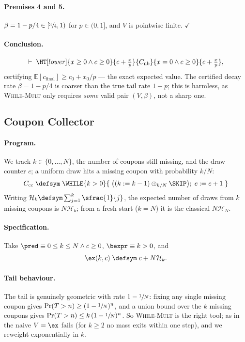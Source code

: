 \paragraph{Premises 4 and 5.}
$\beta = 1 - p/4 \in [\sfrac34, 1)$ for $p \in (0,1]$, and $V$ is pointwise
finite. $\checkmark$

\paragraph{Conclusion.}
\[
  \vdash\; \HT[lower]{x \geq 0 \land c \geq 0}{c + \tfrac{x}{p}}
     {C_{\text{nb}}}{x = 0 \land c \geq 0}{c + \tfrac{x}{p}},
\]
certifying $\mathbb{E}[c_{\text{final}}] \geq c_0 + x_0/p$ --- the exact
expected value. The certified decay rate $\beta = 1-p/4$ is coarser than the
true tail rate $1-p$; this is harmless, as \textsc{While-Mult} only requires
\emph{some} valid pair $(V,\beta)$, not a sharp one.

\subsection{Coupon Collector}\label{app:bench-cc}

\paragraph{Program.}
We track $k \in \{0,\dots,N\}$, the number of coupons still missing, and the
draw counter $c$; a uniform draw hits a missing coupon with probability
$k/N$:
\[
  C_{\text{cc}} \;\defsym\;
  \WHILE{k > 0}{\;
    \bigl((k \mathrel{:=} k-1) \oplus_{k/N} \SKIP\bigr);\;
    c \mathrel{:=} c+1
  \;}
\]
Writing $\mathcal{H}_k \defsym \sum_{j=1}^{k} \sfrac{1}{j}$, the expected
number of draws from $k$ missing coupons is $N \mathcal{H}_k$; from a fresh
start ($k = N$) it is the classical $N \mathcal{H}_N$.

\paragraph{Specification.}
Take $\pred \equiv 0 \leq k \leq N \land c \geq 0$, $\bexpr \equiv k > 0$,
and
\[
  \ex(k,c) \;\defsym\; c + N \mathcal{H}_k.
\]

\paragraph{Tail behaviour.}
The tail is genuinely geometric with rate $1 - \sfrac1N$: fixing any single
missing coupon gives $\Pr(T > n) \geq (1-\sfrac1N)^n$, and a union bound over
the $k$ missing coupons gives $\Pr(T > n) \leq k\,(1-\sfrac1N)^n$. So
\textsc{While-Mult} is the right tool; as in  the naive
$V = \ex$ fails (for $k \geq 2$ no mass exits within one step), and we
reweight exponentially in $k$.

